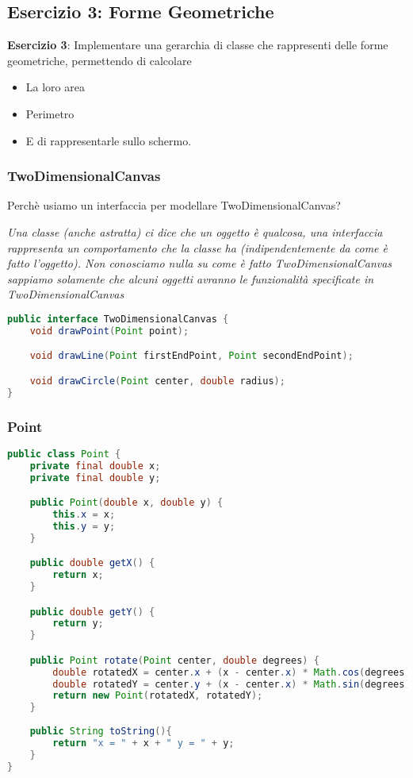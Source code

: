 \documentclass{article}
\begin{document}
\subsection{Esercizio 3: Forme Geometriche}
\begin{framed}
\textbf{Esercizio 3}: Implementare una gerarchia di classe che rappresenti delle forme geometriche, permettendo di calcolare
\begin{itemize}
\item  La loro area
\item Perimetro
\item E di rappresentarle sullo schermo.
\end{itemize}
\end{framed}

\subsubsection{TwoDimensionalCanvas}
Perch\`e usiamo un interfaccia per modellare TwoDimensionalCanvas?

\emph{Una classe (anche astratta) ci dice che un oggetto \`e qualcosa, una interfaccia rappresenta un comportamento che la classe ha (indipendentemente da come \`e fatto l’oggetto). Non conosciamo nulla su come \`e fatto TwoDimensionalCanvas sappiamo solamente che alcuni oggetti avranno le funzionalit\`a specificate in TwoDimensionalCanvas}

\begin{lstlisting}[language=Java,escapechar=|]
public interface TwoDimensionalCanvas {
	void drawPoint(Point point);

	void drawLine(Point firstEndPoint, Point secondEndPoint);

	void drawCircle(Point center, double radius);
}
\end{lstlisting}


\subsubsection{Point}
\begin{lstlisting}[language=Java,escapechar=|]
public class Point {
	private final double x;
	private final double y;

	public Point(double x, double y) {
		this.x = x;
		this.y = y;
	}

	public double getX() {
		return x;
	}

	public double getY() {
		return y;
	}

	public Point rotate(Point center, double degrees) {
		double rotatedX = center.x + (x - center.x) * Math.cos(degrees) - (y - center.y) * Math.sin(degrees);
		double rotatedY = center.y + (x - center.x) * Math.sin(degrees) + (y - center.y) * Math.cos(degrees);
		return new Point(rotatedX, rotatedY);
	}
	
	public String toString(){
		return "x = " + x + " y = " + y;
	}
}
\end{lstlisting}
\end{document}
